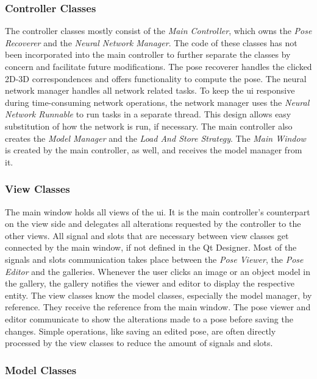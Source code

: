 \subsubsection{Controller Classes}

The controller classes mostly consist of the \textit{Main Controller}, which owns the \textit{Pose Recoverer} and the \textit{Neural Network Manager}. The code of these classes has not been incorporated into the main controller to further separate the classes by concern and facilitate future modifications. The pose recoverer handles the clicked 2D-3D correspondences and offers functionality to compute the pose. The neural network manager handles all network related tasks. To keep the \ac{ui} responsive during time-consuming network operations, the network manager uses the \textit{Neural Network Runnable} to run tasks in a separate thread. This design allows easy substitution of how the network is run, if necessary. The main controller also creates the \textit{Model Manager} and the \textit{Load And Store Strategy}. The \textit{Main Window} is created by the main controller, as well, and receives the model manager from it.

\subsubsection{View Classes}

The main window holds all views of the \ac{ui}. It is the main controller's counterpart on the view side and delegates all alterations requested by the controller to the other views. All signal and slots that are necessary between view classes get connected by the main window, if not defined in the Qt Designer. Most of the signals and slots communication takes place between the \textit{Pose Viewer}, the \textit{Pose Editor} and the galleries. Whenever the user clicks an image or an object model in the gallery, the gallery notifies the viewer and editor to display the respective entity. The view classes know the model classes, especially the model manager, by reference. They receive the reference from the main window. The pose viewer and editor communicate to show the alterations made to a pose before saving the changes. Simple operations, like saving an edited pose, are often directly processed by the view classes to reduce the amount of signals and slots.

\subsubsection{Model Classes}

